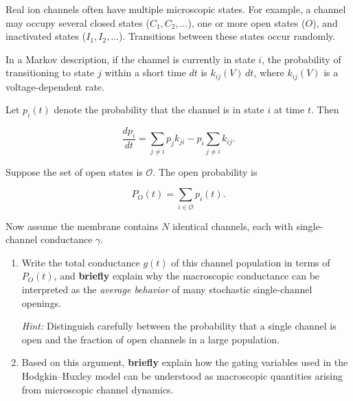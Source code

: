 \documentclass{article}
\begin{document}
Real ion channels often have multiple microscopic states. 
For example, a channel may occupy several closed states ($C_1,C_2,\dots$), 
one or more open states ($O$), and inactivated states ($I_1,I_2,\dots$).
Transitions between these states occur randomly.

In a Markov description, if the channel is currently in state $i$, 
the probability of transitioning to state $j$ within a short time $dt$ is
$k_{ij}(V)\,dt$, where $k_{ij}(V)$ is a voltage-dependent rate.

Let $p_i(t)$ denote the probability that the channel is in state $i$ at time $t$.
Then

\[
\frac{dp_i}{dt} = \sum_{j\ne i} p_j k_{ji} - p_i \sum_{j\ne i} k_{ij}.
\]

Suppose the set of open states is $\mathcal O$. The open probability is

\[
P_O(t)=\sum_{i\in\mathcal O} p_i(t).
\]

Now assume the membrane contains $N$ identical channels, each with
single-channel conductance $\gamma$.

\begin{enumerate}
\item Write the total conductance $g(t)$ of this channel population in terms of $P_O(t)$,
and \textbf{briefly} explain why the macroscopic conductance can be interpreted as the
\emph{average behavior} of many stochastic single-channel openings. 

\textit{Hint:} Distinguish carefully between the probability that a single channel is open and the fraction of open channels in a large population.

\item Based on this argument, \textbf{briefly} explain how the gating variables used in the
Hodgkin–Huxley model can be understood as macroscopic quantities arising
from microscopic channel dynamics.
\end{enumerate}
\end{document}
